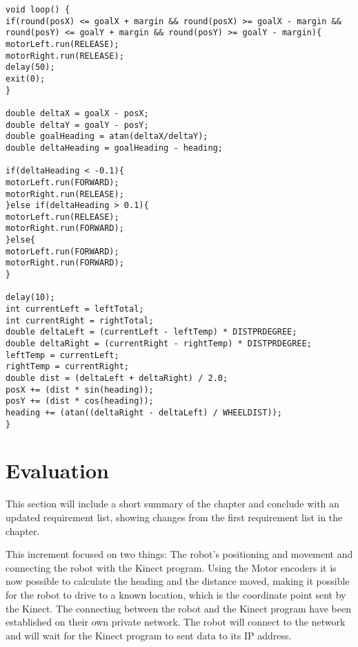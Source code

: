\begin{lstlisting}[caption={The loop function}, label={loop}]
void loop() {
if(round(posX) <= goalX + margin && round(posX) >= goalX - margin &&     round(posY) <= goalY + margin && round(posY) >= goalY - margin){
motorLeft.run(RELEASE);
motorRight.run(RELEASE);
delay(50);
exit(0);
}

double deltaX = goalX - posX;
double deltaY = goalY - posY;
double goalHeading = atan(deltaX/deltaY);
double deltaHeading = goalHeading - heading;

if(deltaHeading < -0.1){
motorLeft.run(FORWARD);
motorRight.run(RELEASE);
}else if(deltaHeading > 0.1){
motorLeft.run(RELEASE);
motorRight.run(FORWARD);
}else{
motorLeft.run(FORWARD);
motorRight.run(FORWARD);
}

delay(10);
int currentLeft = leftTotal;
int currentRight = rightTotal;
double deltaLeft = (currentLeft - leftTemp) * DISTPRDEGREE;
double deltaRight = (currentRight - rightTemp) * DISTPRDEGREE;
leftTemp = currentLeft;
rightTemp = currentRight;
double dist = (deltaLeft + deltaRight) / 2.0;
posX += (dist * sin(heading));
posY += (dist * cos(heading));
heading += (atan((deltaRight - deltaLeft) / WHEELDIST));
}
\end{lstlisting}



\section{Evaluation}
\label{sec:i2Evaluation}
This section will include a short summary of the chapter and conclude with an updated requirement list, showing changes from the first requirement list in the chapter.

This increment focused on two things: The robot's positioning and movement and connecting the robot with the Kinect program. \newline
Using the Motor encoders it is now possible to calculate the heading and the distance moved, making it possible for the robot to drive to a known location, which is the coordinate point sent by the Kinect. \newline
The connecting between the robot and the Kinect program have been established on their own private network. The robot will connect to the network and will wait for the Kinect program to sent data to its IP address.  

